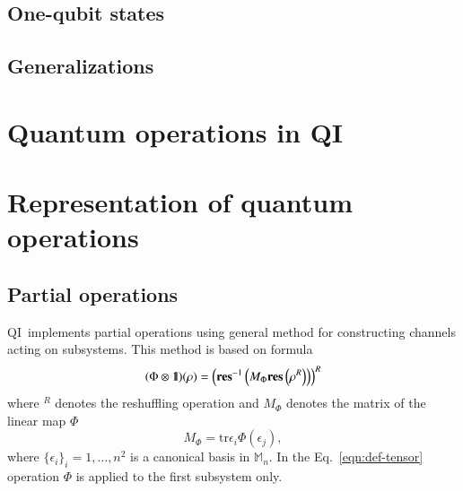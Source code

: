 \documentclass[final,5p,times,twocolumn]{elsarticle}
\newcommand{\res}{\mathbf{res}}
\newcommand{\1}{{\rm 1\hspace{-0.9mm}l}}
\newcommand{\Id}{\1}
\newcommand{\tr}{\mathrm{tr}}
\newcommand{\M}{\ensuremath{\mathbb{M}}}
\newcommand{\qi}{QI}
\begin{document}
\subsection{One-qubit states}

\subsection{Generalizations}
\cite{tilma02generalized}


\section{Quantum operations in \qi}\label{sec:channels}

\section{Representation of quantum operations}


\subsection{Partial operations}
\qi\ implements partial operations using general method for constructing channels
acting on subsystems. This method is based on formula
\begin{equation}\label{eqn:def-tensor}
(\Phi\otimes\Id)(\rho) = 
\left(\res^{-1}\left(M_\Phi\res\left(\rho^R\right)\right)\right)^R
\end{equation}
where ${}^R$ denotes the reshuffling operation and $M_\Phi$ denotes the matrix
of the linear map $\Phi$
\begin{equation}
M_\Phi = \tr \epsilon_i \Phi(\epsilon_j),
\end{equation}
where $\{\epsilon_i\}_i=1,\ldots,n^2$ is a canonical basis in $\M_n$. In the 
Eq.~\ref{eqn:def-tensor} operation $\Phi$ is applied to the first subsystem 
only.
\end{document}
